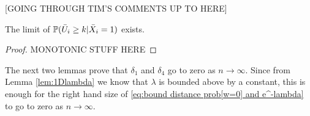 	[GOING THROUGH TIM'S COMMENTS UP TO HERE]
	
	\begin{lemma}
		\label{lem: lim U bar exists}
		The limit of $\mathbb{P}(\bar{U}_i \geq k | \bar{X}_i = 1)$ exists.
	\end{lemma}
	\begin{proof}
		MONOTONIC STUFF HERE
	\end{proof}
	

	The next two lemmas prove that $\delta_1$ and $\delta_4$ go to zero as $n \rightarrow \infty$. Since from Lemma \ref{lem:1Dlambda} we know that $\lambda$ is bounded above by a constant, this is enough for the right hand size of \eqref{eq:bound distance prob[w=0] and e^-lambda} to go to zero as $n \rightarrow \infty$.

